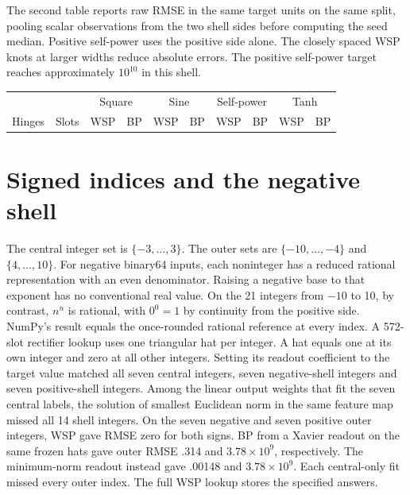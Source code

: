 The second table reports raw RMSE in the same target units on the same split, pooling scalar observations from the two shell sides before computing the seed median. Positive self-power uses the positive side alone. The closely spaced WSP knots at larger widths reduce absolute errors. The positive self-power target reaches approximately \(10^{10}\) in this shell.
\begin{center}
\begin{minipage}{\linewidth}
\centering
\makeatletter{}\makeatother
\caption{Root mean squared error (RMSE) for the same shallow networks and outer draws. WSP uses full-envelope knots, and BP is the median of three fits.}\label{tab:initial_rmse}
\scriptsize\setlength{\tabcolsep}{2.8pt}
\begin{tabular}{@{}rr|rr|rr|rr|rr@{}}\toprule
 & & \multicolumn{2}{c|}{Square} & \multicolumn{2}{c|}{Sine} & \multicolumn{2}{c|}{Self-power} & \multicolumn{2}{c}{Tanh}\\
Hinges & Slots & WSP & BP & WSP & BP & WSP & BP & WSP & BP\\\midrule

\end{tabular}
\end{minipage}
\end{center}

\section{Signed indices and the negative shell}\label{app:signed}
The central integer set is \(\{-3,\ldots,3\}\). The outer sets are \(\{-10,\ldots,-4\}\) and \(\{4,\ldots,10\}\). For negative binary64 inputs, each noninteger has a reduced rational representation with an even denominator. Raising a negative base to that exponent has no conventional real value. On the 21 integers from \(-10\) to 10, by contrast, \(n^n\) is rational, with \(0^0=1\) by continuity from the positive side. NumPy's result equals the once-rounded rational reference at every index. A 572-slot rectifier lookup uses one triangular hat per integer. A hat equals one at its own integer and zero at all other integers. Setting its readout coefficient to the target value matched all seven central integers, seven negative-shell integers and seven positive-shell integers. Among the linear output weights that fit the seven central labels, the solution of smallest Euclidean norm in the same feature map missed all 14 shell integers. On the seven negative and seven positive outer integers, WSP gave RMSE zero for both signs. BP from a Xavier readout on the same frozen hats gave outer RMSE .314 and \(3.78\times10^9\), respectively. The minimum-norm readout instead gave .00148 and \(3.78\times10^9\). Each central-only fit missed every outer index. The full WSP lookup stores the specified answers.

